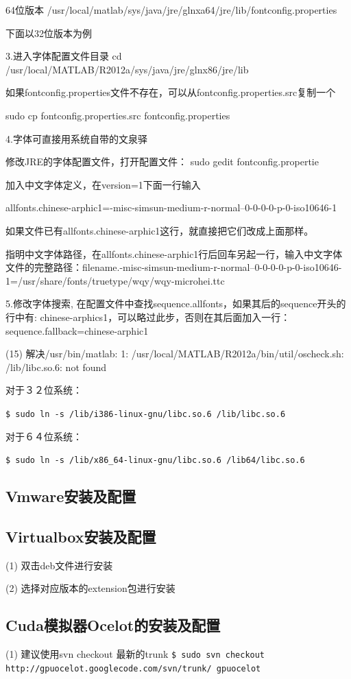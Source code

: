 64位版本 /usr/local/matlab/sys/java/jre/glnxa64/jre/lib/fontconfig.properties

下面以32位版本为例

3.进入字体配置文件目录 cd /usr/local/MATLAB/R2012a/sys/java/jre/glnx86/jre/lib

如果fontconfig.properties文件不存在，可以从fontconfig.properties.src复制一个

sudo cp fontconfig.properties.src fontconfig.properties

4.字体可直接用系统自带的文泉驿

修改JRE的字体配置文件，打开配置文件： sudo gedit fontconfig.propertie

加入中文字体定义，在version=1下面一行输入

allfonts.chinese-arphic1=-misc-simsun-medium-r-normal--0-0-0-0-p-0-iso10646-1

如果文件已有allfonts.chinese-arphic1这行，就直接把它们改成上面那样。

指明中文字体路径，在allfonts.chinese-arphic1行后回车另起一行，输入中文字体文件的完整路径：filename.-misc-simsun-medium-r-normal--0-0-0-0-p-0-iso10646-1=/usr/share/fonts/truetype/wqy/wqy-microhei.ttc

5.修改字体搜索, 在配置文件中查找sequence.allfonts，如果其后的sequence开头的行中有: chinese-arphics1，可以略过此步，否则在其后面加入一行：sequence.fallback=chinese-arphic1

(15) 解决/usr/bin/matlab: 1: /usr/local/MATLAB/R2012a/bin/util/oscheck.sh: /lib/libc.so.6: not found

对于３２位系统：

\verb"$ sudo ln -s /lib/i386-linux-gnu/libc.so.6 /lib/libc.so.6"

对于６４位系统：

\verb"$ sudo ln -s /lib/x86_64-linux-gnu/libc.so.6 /lib64/libc.so.6"

\subsection{Vmware安装及配置}

\subsection{Virtualbox安装及配置}
(1) 双击deb文件进行安装

(2) 选择对应版本的extension包进行安装

\subsection{Cuda模拟器Ocelot的安装及配置}
(1) 建议使用svn checkout 最新的trunk
\verb"$ sudo svn checkout http://gpuocelot.googlecode.com/svn/trunk/ gpuocelot"
 
